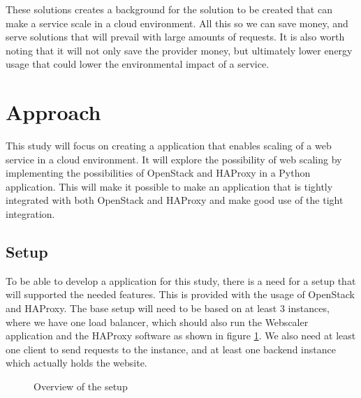 These solutions creates a background for the solution to be created that can
make a service scale in a cloud environment. All this so we can save money, and
serve solutions that will prevail with large amounts of requests.
It is also worth noting that it will not only save the provider money, but
ultimately lower energy usage that could lower the environmental impact of a
service.



\section{Approach}
This study will focus on creating a application that enables scaling of a web 
service in a cloud environment. It will explore the possibility of web scaling
by implementing the possibilities of OpenStack and HAProxy in a Python
application. 
This will make it possible to make an application that is tightly integrated
with both OpenStack and HAProxy and make good use of the tight integration.

\subsection{Setup}
To be able to develop a application for this study, there is a need for a setup
that will supported the needed features. This is provided with the usage of
OpenStack and HAProxy. The base setup will need to be based on at least 3
instances, where we have one load balancer, which should also run the Webscaler
application and the HAProxy software as shown in figure \ref{fig:overview}. We
also need at least one client to send requests to the instance, and at least
one backend instance which actually holds the website.

\begin{figure}[htp]
\centering
{}
\caption{\label{fig:overview}Overview of the setup}
\end{figure}

